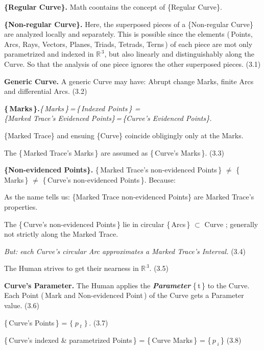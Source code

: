 \documentclass[12pt]{article} %
\begin{document}
\noindent \textbf{\{Regular Curve\}.} Math coontains the concept of \{Regular Curve\}.
  
\noindent \textbf{\{Non-regular Curve\}.} Here, the superposed pieces of a \{Non-regular Curve\} are analyzed locally and separately. This is possible since the elements (\,Points, Arcs, Rays, Vectors, Planes, Triads, Tetrads, Terns\,) of each piece are mot only parametrized and indexed in $\mathbb{R}^{\,3}$, but also linearly and distinguishably along the Curve. So that the analysis of one piece ignores the other superposed pieces. \qquad \qquad (3.1)

\noindent \textbf{Generic Curve.} A generic Curve may have: Abrupt change Marks, finite Arcs and differential Arcs. \qquad (3.2)

\noindent\textbf{\{\,Marks\,\}.}\qquad \textsl{\{\,Marks\,\}\,=\,\{\,Indexed Points\,\} =\\ \{Marked Trace's Evidenced Points\}\,=\,\{Curve's Evidenced Points\}.}  

\noindent \{Marked Trace\} and ensuing \{Curve\} coincide obligingly only at the Marks. 

\noindent The \{\,Marked Trace's Marks\,\} are assumed as \{\,Curve's Marks\,\}. (3.3)

\noindent \textbf{\{Non-evidenced Points\}.} \{\,Marked Trace's non-evidenced Points\,\} $\neq$ \{\,Marks\,\} $\neq$ \{\,Curve's non-evidenced Points\,\}. Because:

\noindent As the name tells us: \{Marked Trace non-evidenced Points\} are Marked Trace's properties. 

\noindent The \{\,Curve's non-evidenced Points\,\} lie in circular \{\,Arcs\,\} $\subset$ Curve ; generally not strictly along the Marked Trace.

\noindent \textsl{But: each Curve's circular Arc approximates a Marked Trace's Interval.} (3.4) 

\noindent The Human strives to get their nearness in $\mathbb{R}^{\,3}$. \qquad \qquad (3.5)

\noindent \textbf{Curve's Parameter.} The Human applies the \textbf{\textsl{Parameter}} \{\,t\,\} to the Curve. Each Point (\,Mark and Non-evidenced Point\,) of the Curve gets a Parameter value. \qquad (3.6)

\noindent \{\,Curve's Points\,\} = $\{\;p_{\;t}\;\}$\,. \qquad (3.7)

\noindent \{\,Curve's indexed \& parametrized Points\,\} = \{\,Curve Marks\,\} = \{\,$p_{\;i}$\,\} \qquad (3.8)
\end{document}
